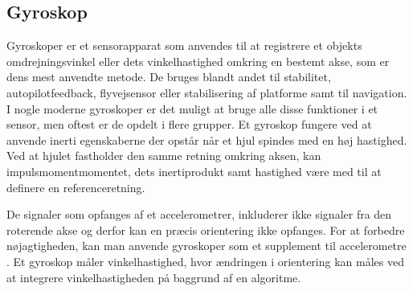 \subsection{Gyroskop}

Gyroskoper er et sensorapparat som anvendes til at registrere et objekts omdrejningsvinkel eller dets vinkelhastighed omkring en bestemt akse, som er dens mest anvendte metode. De bruges 
blandt andet til stabilitet, autopilotfeedback, flyvejsensor eller stabilisering af platforme samt til navigation. 
I nogle moderne gyroskoper er det muligt at bruge alle disse funktioner i et sensor, men oftest er de opdelt i flere grupper. 
Et gyroskop fungere ved at anvende inerti egenskaberne der opstår når et hjul spindes med en høj hastighed. Ved at hjulet fastholder den samme retning omkring aksen, kan impulsmomentmomentet, dets inertiprodukt samt hastighed være med til at definere en referenceretning. 


De signaler som opfanges af et accelerometrer, inkluderer ikke signaler fra den roterende akse og derfor kan en præcis orientering ikke opfanges. For at forbedre nøjagtigheden, kan man anvende gyroskoper som et supplement til accelerometre .
Et gyroskop måler vinkelhastighed, hvor ændringen i orientering kan måles ved at integrere vinkelhastigheden på baggrund af en algoritme. \citep{LuingeVeltink2005}